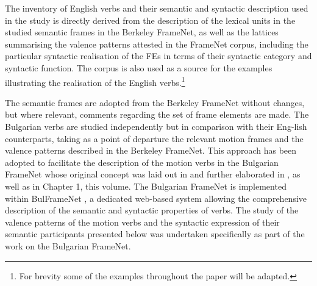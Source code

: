 \documentclass[output=paper,colorlinks,citecolor=brown]{langscibook}
\begin{document}
The inventory of English verbs and their semantic and syntactic description used in the study is directly derived from the description of the lexical units in the studied semantic frames in the Berkeley FrameNet, as well as the lattices summarising the valence patterns attested in the FrameNet corpus, including the particular syntactic realisation of the FEs in terms of their syntactic category and syntactic function. The corpus is also used as a source for the examples illustrating the realisation of the English verbs.\footnote{For brevity some of the examples throughout the paper will be adapted.}



The semantic frames are adopted from the Berkeley FrameNet without changes, but where relevant, comments regarding the set of frame elements are made. The Bulgarian verbs are studied independently but in comparison with their Eng-\newline lish counterparts, taking as a point of departure the relevant motion frames and the valence patterns described in the Berkeley FrameNet. This approach has been adopted to facilitate the description of the motion verbs in the Bulgarian FrameNet whose original concept was laid out in \citet{Koeva2008-framenet, Koeva2010-framenet} and further elaborated in \citet{svetla2021towards}, as well as in Chapter 1, this volume. The Bulgarian FrameNet is implemented within BulFrameNet \citep{koeva-doychev-2022-ontology}, a dedicated web-based system allowing the comprehensive description of the semantic and syntactic properties of verbs. The study of the valence patterns of the motion verbs and the syntactic expression of their semantic participants presented below was undertaken specifically as part of the work on the Bulgarian FrameNet. 
\end{document}
